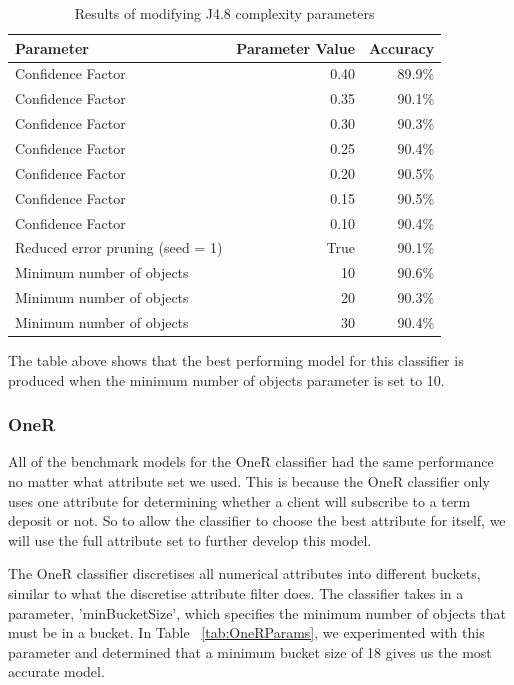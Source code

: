 \documentclass[a4paper,11pt]{article}
\begin{document}
\begin{table}[H]
  \begin{center}
    \begin{tabular}{l | r | r}
      Parameter & Parameter Value & Accuracy  \\ \hline
      Confidence Factor & 0.40 & 89.9\% \\
      Confidence Factor & 0.35 & 90.1\% \\
      Confidence Factor & 0.30 & 90.3\% \\
      Confidence Factor & 0.25 & 90.4\% \\
      Confidence Factor & 0.20 & 90.5\% \\
      Confidence Factor & 0.15 & 90.5\% \\
      Confidence Factor & 0.10 & 90.4\% \\
      Reduced error pruning (seed = 1) & True & 90.1\% \\
      Minimum number of objects  & 10 & 90.6\% \\
      Minimum number of objects  & 20 & 90.3\% \\
      Minimum number of objects  & 30 & 90.4\% \\
    \end{tabular}
  \end{center}
  \caption{Results of modifying J4.8 complexity parameters}
  \label{tab:J48Params}
\end{table}

The table above shows that the best performing model for this classifier is produced when the minimum number of objects
parameter is set to 10.

\subsubsection{OneR}

All of the benchmark models for the OneR classifier had the same performance no matter what attribute set we used. This
is because the OneR classifier only uses one attribute for determining whether a client will subscribe to a term deposit
or not. So to allow the classifier to choose the best attribute for itself, we will use the full attribute set to
further develop this model.

The OneR classifier discretises all numerical attributes into different buckets, similar to what the discretise 
attribute filter does. The classifier takes in a parameter, 'minBucketSize', which specifies the minimum number of objects 
that must be in a bucket. In Table ~\ref{tab:OneRParams}, we experimented with this parameter and determined that a minimum
bucket size of 18 gives us the most accurate model.
\end{document}

